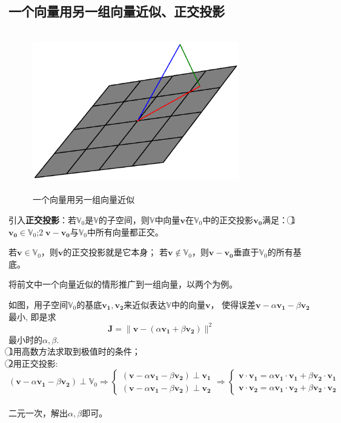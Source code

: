 \documentclass{article}
\begin{document}
\begin{CJK}{UTF8}{gbsn}
\section{一个向量用另一组向量近似、正交投影}
\begin{figure}[H]
\centering
\includegraphics[height=7cm,width=9cm]{fig2.eps}
\caption{一个向量用另一组向量近似}
\label{2}
\end{figure}
	引入\textbf{正交投影}：若$\mathbb{V}_0$是$\mathbb{V}$的子空间，则$\mathbb{V}$中向量$\boldsymbol{v}$在$\mathbb{V}_0$中的正交投影$\boldsymbol{v_0}$满足：
	\textcircled{1}$\boldsymbol{v_0}\in\mathbb{V}_0$;\textcircled{2}$\boldsymbol{v}-\boldsymbol{v_0}$与$\mathbb{V}_0$中所有向量都正交。\par
	若$\boldsymbol{v}\in\mathbb{V}_0$，则$\boldsymbol{v}$的正交投影就是它本身；
	若$\boldsymbol{v}\notin\mathbb{V}_0$，则$\boldsymbol{v}-\boldsymbol{v_0}$垂直于$\mathbb{V}_0$的所有基底。\par
	将前文中一个向量近似的情形推广到一组向量，以两个为例。\par
	如图，用子空间$\mathbb{V}_0$的基底$\boldsymbol{v_1},\boldsymbol{v_2}$来近似表达$\mathbb{V}$中的向量$\boldsymbol{v}$，
	使得误差$\boldsymbol{v}-\alpha\boldsymbol{v_1}-\beta\boldsymbol{v_2}$最小,
	即是求$$\boldsymbol{J}=\parallel\boldsymbol{v}-(\alpha\boldsymbol{v_1}+\beta\boldsymbol{v_2})\parallel ^2$$最小时的$\alpha,\beta$.\\
	\indent\textcircled{1}用高数方法求取到极值时的条件；\\
    \indent\textcircled{2}用正交投影:
	$$(\boldsymbol{v}-\alpha\boldsymbol{v_1}-\beta\boldsymbol{v_2})\perp\mathbb{V}_0
	\Rightarrow\left\{\begin{aligned}(\boldsymbol{v}-\alpha\boldsymbol{v_1}-\beta\boldsymbol{v_2})\perp\boldsymbol{v_1}\\
	(\boldsymbol{v}-\alpha\boldsymbol{v_1}-\beta\boldsymbol{v_2})\perp\boldsymbol{v_2}\end{aligned}\right.
	\Rightarrow\left\{\begin{aligned}\boldsymbol{v}\cdot\boldsymbol{v_1}=\alpha\boldsymbol{v_1}\cdot\boldsymbol{v_1}+\beta\boldsymbol{v_2}\cdot\boldsymbol{v_1}\\
	\boldsymbol{v}\cdot\boldsymbol{v_2}=\alpha\boldsymbol{v_1}\cdot\boldsymbol{v_2}+\beta\boldsymbol{v_2}\cdot\boldsymbol{v_2}\end{aligned}\right.$$\\
	二元一次，解出$\alpha,\beta$即可。\\



\end{CJK}
\end{document}
